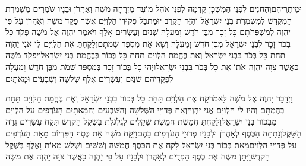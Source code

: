 \documentclass[../main/main.tex]{subfiles}
\begin{document}
\begin{multicols*}{\ncols}
וּמֵיתְרֵיהֶם\PreVerseSpace{}וְהַחֹנִים לִפְנֵי הַמִּשְׁכָּן קֵדְמָה לִפְנֵי אֹהֶל מוֹעֵד מִזְרָחָה מֹשֶׁה וְאַהֲרֹן וּבָנָיו שֹׁמְרִים מִשְׁמֶרֶת הַמִּקְדָּשׁ לְמִשְׁמֶרֶת בְּנֵי יִשְׂרָאֵל וְהַזָּר הַקָּרֵב יוּמָת\PreVerseSpace{}כָּל פְּקוּדֵי הַלְוִיִּם אֲשֶׁר פָּקַד מֹשֶׁה וְאַהֲרֹן עַל פִּי יַהְוֶה לְמִשְׁפְּחֹתָם כָּל זָכָר מִבֶּן חֹדֶשׁ וָמַעְלָה שְׁנַיִם וְעֶשְׂרִים אָלֶף \ClosedSection{}וַיֹּאמֶר יַהְוֶה אֶל מֹשֶׁה פְּקֹד כָּל בְּכֹר זָכָר לִבְנֵי יִשְׂרָאֵל מִבֶּן חֹדֶשׁ וָמָעְלָה וְשָׂא אֵת מִסְפַּר שְׁמֹתָם\PreVerseSpace{}וְלָקַחְתָּ אֶת הַלְוִיִּם לִי אֲנִי יַהְוֶה תַּחַת כָּל בְּכֹר בִּבְנֵי יִשְׂרָאֵל וְאֵת בֶּהֱמַת הַלְוִיִּם תַּחַת כָּל בְּכוֹר בְּבֶהֱמַת בְּנֵי יִשְׂרָאֵל\PreVerseSpace{}וַיִּפְקֹד מֹשֶׁה כַּאֲשֶׁר צִוָּה יַהְוֶה אֹתוֹ אֶת כָּל בְּכֹר בִּבְנֵי יִשְׂרָאֵל\PreVerseSpace{}וַיְהִי כָל בְּכוֹר זָכָר בְּמִסְפַּר שֵׁמֹת מִבֶּן חֹדֶשׁ וָמַעְלָה לִפְקֻדֵיהֶם שְׁנַיִם וְעֶשְׂרִים אֶלֶף שְׁלֹשָׁה וְשִׁבְעִים וּמָאתָיִם\OpenSection{}\par
{}וַיְדַבֵּר יַהְוֶה אֶל מֹשֶׁה לֵּאמֹר\PreVerseSpace{}קַח אֶת הַלְוִיִּם תַּחַת כָּל בְּכוֹר בִּבְנֵי יִשְׂרָאֵל וְאֶת בֶּהֱמַת הַלְוִיִּם תַּחַת בְּהֶמְתָּם וְהָיוּ לִי הַלְוִיִּם אֲנִי יַהְוֶה\PreVerseSpace{}וְאֵת פְּדוּיֵי הַשְּׁלֹשָׁה וְהַשִּׁבְעִים וְהַמָּאתָיִם הָעֹדְפִים עַל הַלְוִיִּם מִבְּכוֹר בְּנֵי יִשְׂרָאֵל\PreVerseSpace{}וְלָקַחְתָּ חֲמֵשֶׁת חֲמֵשֶׁת שְׁקָלִים לַגֻּלְגֹּלֶת בְּשֶׁקֶל הַקֹּדֶשׁ תִּקָּח עֶשְׂרִים גֵּרָה הַשָּׁקֶל\PreVerseSpace{}וְנָתַתָּה הַכֶּסֶף לְאַהֲרֹן וּלְבָנָיו פְּדוּיֵי הָעֹדְפִים בָּהֶם\PreVerseSpace{}וַיִּקַּח מֹשֶׁה אֵת כֶּסֶף הַפִּדְיוֹם מֵאֵת הָעֹדְפִים עַל פְּדוּיֵי הַלְוִיִּם\PreVerseSpace{}מֵאֵת בְּכוֹר בְּנֵי יִשְׂרָאֵל לָקַח אֶת הַכָּסֶף חֲמִשָּׁה וְשִׁשִּׁים וּשְׁלֹשׁ מֵאוֹת וָאֶלֶף בְּשֶׁקֶל הַקֹּדֶשׁ\PreVerseSpace{}וַיִּתֵּן מֹשֶׁה אֶת כֶּסֶף הַפְּדֻיִם לְאַהֲרֹן וּלְבָנָיו עַל פִּי יַהְוֶה כַּאֲשֶׁר צִוָּה יַהְוֶה אֶת מֹשֶׁה\OpenSection{}\par

\end{multicols*}
\end{document}
